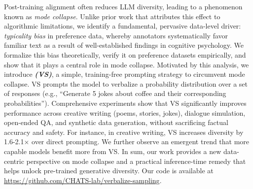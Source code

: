 {Post-training alignment often reduces LLM diversity, leading to a phenomenon known as \emph{mode collapse}}. Unlike prior work that attributes this effect to algorithmic limitations, we identify a fundamental, pervasive data-level driver: \emph{typicality bias} in preference data, whereby annotators systematically favor familiar text as a result of well-established findings in cognitive psychology. We formalize this bias theoretically, verify it on preference datasets empirically, and show that it plays a central role in mode collapse. Motivated by this analysis, we introduce \emph{\textbf{\ours (VS)}}, a simple, training-free prompting strategy to circumvent mode collapse. VS prompts the model to verbalize a probability distribution over a set of responses (e.g., ``Generate 5 jokes about coffee and their corresponding probabilities'').
Comprehensive experiments show that VS significantly improves performance across creative writing (poems, stories, jokes), dialogue simulation, open-ended QA, and synthetic data generation, without sacrificing factual accuracy and safety. For instance, in creative writing, VS increases diversity by 1.6-2.1$\times$ over direct prompting. 
We further observe an emergent trend that more capable models benefit more from VS.
In sum, our work provides a new data-centric perspective on mode collapse and a practical inference-time remedy that helps unlock pre-trained generative diversity. Our code is available at \url{https://github.com/CHATS-lab/verbalize-sampling}. 



